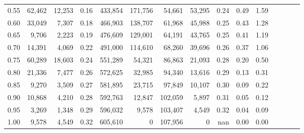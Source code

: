 \begin{tabular}{rrrcrrrrrrrrrrr}
0.55 &  62,462 &  12,253 &                                       0.16 &  433,854 &  171,756 &   54,661 &   53,295 &  0.24 &  0.49 &                         1.59 \\
0.60 &  33,049 &   7,307 &                                       0.18 &  466,903 &  138,707 &   61,968 &   45,988 &  0.25 &  0.43 &                         1.28 \\
0.65 &   9,706 &   2,223 &                                       0.19 &  476,609 &  129,001 &   64,191 &   43,765 &  0.25 &  0.41 &                         1.19 \\
0.70 &  14,391 &   4,069 &                                       0.22 &  491,000 &  114,610 &   68,260 &   39,696 &  0.26 &  0.37 &                         1.06 \\
0.75 &  60,289 &  18,603 &                                       0.24 &  551,289 &   54,321 &   86,863 &   21,093 &  0.28 &  0.20 &                         0.50 \\
0.80 &  21,336 &   7,477 &                                       0.26 &  572,625 &   32,985 &   94,340 &   13,616 &  0.29 &  0.13 &                         0.31 \\
0.85 &   9,270 &   3,509 &                                       0.27 &  581,895 &   23,715 &   97,849 &   10,107 &  0.30 &  0.09 &                         0.22 \\
0.90 &  10,868 &   4,210 &                                       0.28 &  592,763 &   12,847 &  102,059 &    5,897 &  0.31 &  0.05 &                         0.12 \\
0.95 &   3,269 &   1,348 &                                       0.29 &  596,032 &    9,578 &  103,407 &    4,549 &  0.32 &  0.04 &                         0.09 \\
1.00 &   9,578 &   4,549 &                                       0.32 &  605,610 &        0 &  107,956 &        0 &   nan &  0.00 &                         0.00 \\
\bottomrule
\end{tabular}
